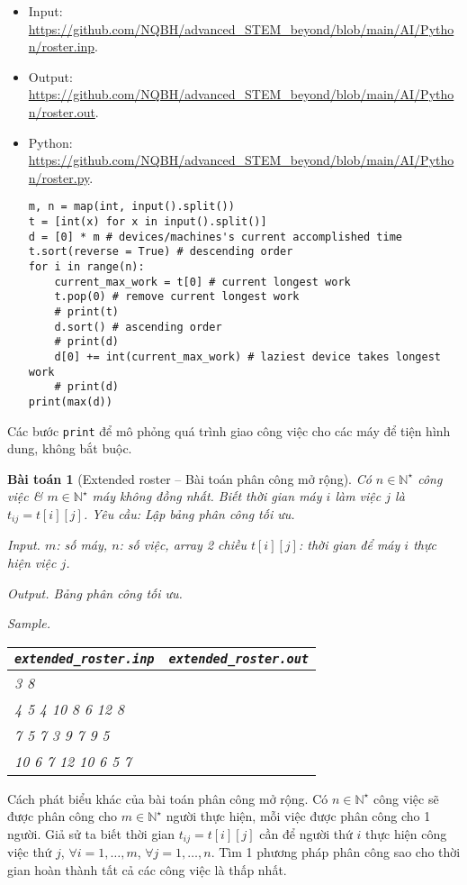 \documentclass{article}
\newtheorem{baitoan}{Bài toán}
\begin{document}
\begin{itemize}
	\item Input: \url{https://github.com/NQBH/advanced_STEM_beyond/blob/main/AI/Python/roster.inp}.
	\item Output: \url{https://github.com/NQBH/advanced_STEM_beyond/blob/main/AI/Python/roster.out}.
	\item Python: \url{https://github.com/NQBH/advanced_STEM_beyond/blob/main/AI/Python/roster.py}.
\begin{verbatim}
m, n = map(int, input().split())
t = [int(x) for x in input().split()]
d = [0] * m # devices/machines's current accomplished time
t.sort(reverse = True) # descending order
for i in range(n):
    current_max_work = t[0] # current longest work
    t.pop(0) # remove current longest work
    # print(t)
    d.sort() # ascending order
    # print(d)
    d[0] += int(current_max_work) # laziest device takes longest work
    # print(d)
print(max(d))
\end{verbatim}
\end{itemize}
Các bước {\tt print} để mô phỏng quá trình giao công việc cho các máy để tiện hình dung, không bắt buộc.


\begin{baitoan}[Extended roster -- Bài toán phân công mở rộng]
	Có $n\in\mathbb{N}^\star$ công việc \& $m\in\mathbb{N}^\star$ máy không đồng nhất. Biết thời gian máy $i$ làm việc $j$ là $t_{ij} = t[i][j]$. Yêu cầu: Lập bảng phân công tối ưu.
	\item {\sf Input.} $m$: số máy, $n$: số việc, array 2 chiều $t[i][j]$: thời gian để máy $i$ thực hiện việc $j$.
	\item {\sf Output.} Bảng phân công tối ưu.
	\item {\sf Sample.}
	\begin{table}[H]
		\centering
		\begin{tabular}{|l|l|}
			\hline
			\verb|extended_roster.inp| & \verb|extended_roster.out| \\
			\hline
			3 8 &  \\
			4 5 4 10 8 6 12 8 &  \\
			7 5 7 3 9 7 9 5 &  \\
			10 6 7 12 10 6 5 7 &  \\
			\hline
		\end{tabular}
	\end{table}
\end{baitoan}
{\sf Cách phát biểu khác của bài toán phân công mở rộng.} Có $n\in\mathbb{N}^\star$ công việc sẽ được phân công cho $m\in\mathbb{N}^\star$ người thực hiện, mỗi việc được phân công cho 1 người. Giả sử ta biết thời gian $t_{ij} = t[i][j]$ cần để người thứ $i$ thực hiện công việc thứ $j$, $\forall i = 1,\ldots,m$, $\forall j = 1,\ldots,n$. Tìm 1 phương pháp phân công sao cho thời gian hoàn thành tất cả các công việc là thấp nhất.
\end{document}
